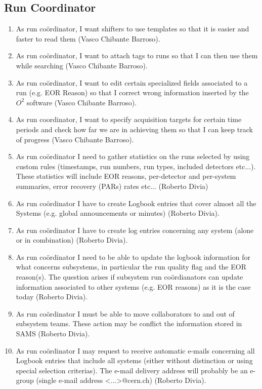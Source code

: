 \subsection{Run Coordinator}
\begin{enumerate}
  \item As run co\"ordinator, I want shifters to use templates so that it is easier and faster to read them (Vasco Chibante Barroso). 
  \item As run co\"ordinator, I want to attach tags to runs so that I can then use them while searching (Vasco Chibante Barroso). 
  \item As run co\"ordinator, I want to edit certain specialized fields associated to a run (e.g. EOR Reason) so that I correct wrong information inserted by the $O^2$ software (Vasco Chibante Barroso). 
  \item As run coordinator, I want to specify acquisition targets for certain time periods and check how far we are in achieving them so that I can keep track of progress (Vasco Chibante Barroso). 
  \item As run co\"ordinator I need to gather statistics on the runs selected by using custom rules (timestamps, run numbers, run types, included detectors etc...). These statistics will include EOR reasons, per-detector and per-system summaries, error recovery (PARs) rates etc... (Roberto Divia)
  \item As run co\"ordinator I have to create Logbook entries that cover almost all the Systems (e.g. global announcements or minutes) (Roberto Divia).
  \item As run co\"ordinator I have to create log entries concerning any system (alone or in combination) (Roberto Divia).
  \item As run co\"ordinator I need to be able to update the logbook information for what concerns subsystems, in particular the run quality flag and the EOR reason(s). The question arises if subsystem run co\"ordianators can update information associated to other systems (e.g. EOR reasons) as it is the case today (Roberto Divia).
  \item As run co\"ordinator I must be able to move collaborators to and out of subsystem teams. These action may be conflict the information stored in SAMS (Roberto Divia).
  \item As run co\"ordinator I may request to receive automatic e-mails concerning all Logbook entries that include all systems (either without distinction or using special selection criterias). The e-mail delivery address will probably be an e-group (single e-mail address <...>@cern.ch) (Roberto Divia).

\end{enumerate}
